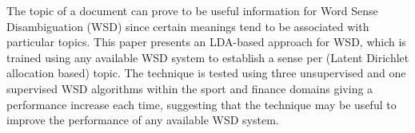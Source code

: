 The topic of a document can prove to be useful information for Word Sense Disambiguation (WSD) since certain meanings tend to be associated with
 particular topics. This paper presents an LDA-based approach for WSD, which is
 trained using any available WSD system to establish a sense per (Latent
 Dirichlet allocation based) topic. The technique is tested using three
 unsupervised and one supervised WSD algorithms within the sport and finance
 domains giving a performance increase each time, suggesting that the technique
 may be useful to improve the performance of any available WSD system.

